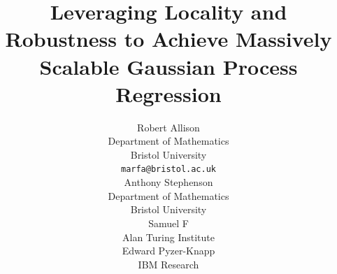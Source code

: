 \documentclass{article}
\title{Leveraging Locality and Robustness to Achieve Massively Scalable Gaussian Process Regression}
\author{%
  Robert Allison \\
  Department of Mathematics\\
  Bristol University\\
  \texttt{marfa@bristol.ac.uk} \\
\And
  Anthony Stephenson \\
  Department of Mathematics\\
  Bristol University\\
\And
  Samuel F \\
  Alan Turing Institute \\  
\And
  Edward Pyzer-Knapp \\
  IBM Research 
}
\theoremstyle{plain}
\def\biblio{}  %
\begin{document}
\def\biblio{}

\maketitle

\begingroup
\let\clearpage\relax

\endgroup


\begingroup
\let\clearpage\relax

\endgroup

% 
% 

\end{document}
